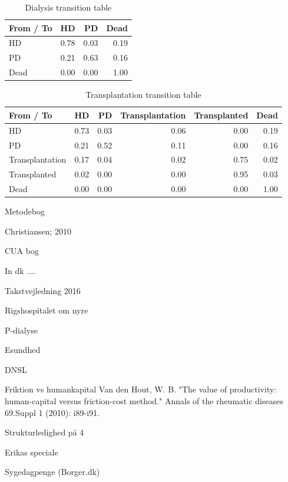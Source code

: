 \documentclass[a4paper,12pt]{article}
\begin{document}
\begin{table}[ht]
	\centering
	\caption{Dialysis transition table} 
		\begin{tabular}{l|rrr}
			\hline
			From / To & HD & PD & Dead \\ 
			\hline
			\hline
			HD & 0.78 & 0.03 & 0.19 \\ 
			PD & 0.21 & 0.63 & 0.16 \\ 
			Dead & 0.00 & 0.00 & 1.00 \\ 
			\hline
		\end{tabular}
\end{table}



\begin{table}[ht]
	\centering
	\caption{Transplantation transition table} 
	\begin{tabular}{l|rrrrr}
		\hline
		From / To & HD & PD & Transplantation & Transplanted & Dead \\ 
		\hline
		\hline
		HD & 0.73 & 0.03 & 0.06 & 0.00 & 0.19 \\ 
		PD & 0.21 & 0.52 & 0.11 & 0.00 & 0.16 \\ 
		Transplantation & 0.17 & 0.04 & 0.02 & 0.75 & 0.02 \\ 
		Transplanted & 0.02 & 0.00 & 0.00 & 0.95 & 0.03 \\ 
		Dead & 0.00 & 0.00 & 0.00 & 0.00 & 1.00 \\ 
		\hline
	\end{tabular}
\end{table}






\newpage

\begin{thebibliography}{9}

Metodebog

Christiansen; 2010

CUA bog

In dk .... 

Takstvejledning 2016

Rigshospitalet om nyre

P-dialyse

Esundhed

DNSL

Friktion vs humankapital
Van den Hout, W. B. "The value of productivity: human-capital versus friction-cost method." Annals of the rheumatic diseases 69.Suppl 1 (2010): i89-i91.

Strukturledighed på 4%

Erikas speciale 

Sygedagpenge (Borger.dk)


\end{thebibliography}	
	
\end{document}
